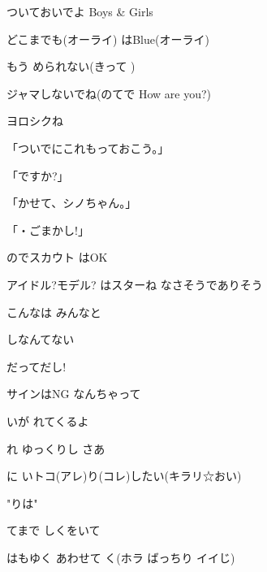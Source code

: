 \documentclass[14pt]{extreport}
\begin{document}
{  ついておいでよ Boys \& Girls
  \jisho{}

  どこまでも(オーライ) はBlue(オーライ)
  \jisho{}

  もう められない(きって )
  \jisho{}

  ジャマしないでね(のてで How are you?)
  \jisho{}

  ヨロシクね
  \jisho{}

\item
  「ついでにこれもっておこう。」
  \jisho{}

  「ですか?」
  \jisho{}

  「かせて、シノちゃん。」
  \jisho{}

  「・ごまかし!」
  \jisho{}

\item
  のでスカウト はOK
  \jisho{}

  アイドル?モデル? はスターね なさそうでありそう
  \jisho{}

  こんなは みんなと
  \jisho{}

  しなんてない
  \jisho{}

  だってだし!
  \jisho{}

    サインはNG なんちゃって
  \jisho{}

\item
  いが れてくるよ
  \jisho{}

  れ ゆっくりし さあ
  \jisho{}

  に いトコ(アレ)り(コレ)したい(キラリ☆おい)
  \jisho{}

\item
  "りは"
  \jisho{}

\item
  てまで しくをいて
  \jisho{}

  はもゆく あわせて く(ホラ ばっちり イイじ)
  \jisho{}

}
\end{document}
